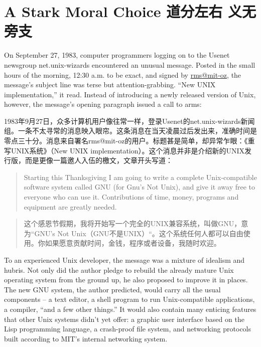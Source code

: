 \chapter{\ifdefined\eng
A Stark Moral Choice
\fi
\ifdefined\chs
道分左右 义无旁支
\fi}

\ifdefined\eng
On September 27, 1983, computer programmers logging on to the Usenet newsgroup net.unix-wizards encountered an unusual message. Posted in the small hours of the morning, 12:30 a.m. to be exact, and signed by \url{rms@mit-oz}, the message's subject line was terse but attention-grabbing. ``New UNIX implementation,'' it read. Instead of introducing a newly released version of Unix, however, the message's opening paragraph issued a call to arms:
\fi

\ifdefined\chs
1983年9月27日，众多计算机用户像往常一样，登录Usenet的net.unix-wizards新闻组。一条不太寻常的消息映入眼帘。这条消息在当天凌晨过后发出来，准确时间是零点三十分。消息来自署名rms@mit-oz的用户。标题甚是简单，却异常乍眼：《重写UNIX系统》（New UNIX implementation）。这个消息并非是介绍新的UNIX发行版，而是更像一篇邀人入伍的檄文，文章开头写道：
\fi

\ifdefined\eng
\begin{quote}
Starting this Thanksgiving I am going to write a complete Unix-compatible software system called GNU (for Gnu's Not Unix), and give it away free to everyone who can use it. Contributions of time, money, programs and equipment are greatly needed.
\end{quote}
\fi

\ifdefined\chs
\begin{quote}
这个感恩节假期，我将开始写一个完全的UNIX兼容系统，叫做GNU，意为``GNU's Not Unix（GNU不是UNIX）``。这个系统任何人都可以自由使用。你如果愿意贡献时间，金钱，程序或者设备，我随时欢迎。
\end{quote}
\fi

\ifdefined\eng
To an experienced Unix developer, the message was a mixture of idealism and hubris. Not only did the author pledge to rebuild the already mature Unix operating system from the ground up, he also proposed to improve it in places. The new GNU system, the author predicted, would carry all the usual components -- a text editor, a shell program to run Unix-compatible applications, a compiler, ``and a few other things.'' It would also contain many enticing features that other Unix systems didn't yet offer: a graphic user interface based on the Lisp programming language, a crash-proof file system, and networking protocols built according to MIT's internal networking system.
\fi

